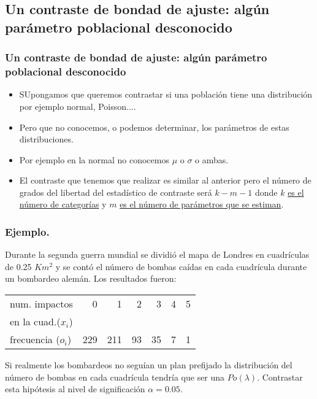\subsection{Un contraste de bondad de ajuste: algún parámetro
           poblacional desconocido}

\begin{frame}
 \frametitle{Un contraste de bondad de ajuste: algún parámetro poblacional desconocido}
\begin{itemize}
\item  SUpongamos que queremos contrastar si una población tiene una distribución por ejemplo normal,  Poisson.... 
\item Pero que no conocemos, o podemos determinar, los parámetros de estas distribuciones.
\item Por ejemplo en la normal no conocemos $\mu$ o $\sigma$ o ambas.
\item El contraste que tenemos que realizar es similar al anterior pero el número de grados del libertad del estadístico de contraste será $k-m-1$ donde $k$ \underline{es el número de  categorías} y $m$ \underline{es el número de parámetros que se estiman}.
\end{itemize}
\end{frame}

\begin{frame}
\frametitle{Ejemplo.}
Durante la segunda guerra mundial se dividió el mapa de Londres en cuadrículas de 0.25 $Km^2$ y se contó el número de bombas caídas en cada cuadrícula durante un bombardeo  alemán. Los resultados fueron:
\begin{center}
           \begin{tabular}{|l|rrrrrr|}
           \hline
           num. impactos  & 0 & 1 & 2 & 3 & 4 & 5 \\
           en la cuad.($x_{i}$)& & & & & & \\
           \hline
           frecuencia ($o_{i}$) & 229 & 211 & 93 & 35 & 7 & 1 \\
           \hline
           \end{tabular}
\end{center}
\end{frame}

\begin{frame}
  Si realmente  los bombardeos no seguían un plan prefijado la distribución del número de bombas en cada cuadrícula tendría que ser una $Po(\lambda)$. Contrastar esta hipótesis al nivel de significación $\alpha=0.05$.

\end{frame}

